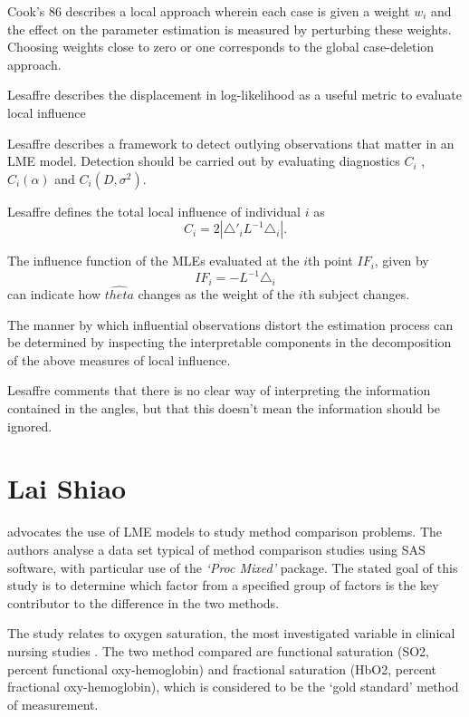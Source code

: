 \documentclass[12pt, a4paper]{report}
\theoremstyle{plain}
\theoremstyle{definition}
\theoremstyle{remark}
\begin{document}
	
	\citep{cook86}
	Cook's 86 describes a local approach wherein each case is given a
	weight $w_{i}$ and the effect on the parameter estimation is
	measured by perturbing these weights. Choosing weights close to
	zero or one corresponds to the global case-deletion approach.
	
	Lesaffre  describes the displacement in log-likelihood as a useful
	metric to evaluate local influence %
	
	Lesaffre describes a framework to detect outlying observations
	that matter in an LME model. Detection should be carried out by
	evaluating diagnostics $C_{i}$ , $C_{i}(\alpha)$ and $C_{i}(D,
	\sigma^2)$.
	
	Lesaffre defines the total local influence of individual $i$ as
	\begin{equation}
	C_{i} = 2 | \triangle \prime _{i} L^{-1} \triangle_{i}|.
	\end{equation}
	
	The influence function of the MLEs evaluated at the $i$th point
	$IF_{i}$, given by
	\begin{equation}
	IF_{i} = -L^{-1}\triangle _{i}
	\end{equation}
	can indicate how $\hat{theta}$ changes as the weight of the $i$th
	subject changes.
	
	The manner by which influential observations
	distort the estimation process can be determined by inspecting the
	interpretable components in the decomposition of the above
	measures of local influence.
	
	
	Lesaffre comments that there is no clear way of interpreting the
	information contained in the angles, but that this doesn't mean
	the information should be ignored.
	
	\section{Lai Shiao}
	
	\citet{LaiShiao} advocates the use of LME models to study method comparison problems. The authors analyse a data set typical of method comparison studies using SAS software, with particular use of the \emph{`Proc Mixed'} package. The stated goal of this study is to determine which factor from a specified group of factors is the key contributor to the difference in the two methods.
	
	The study relates to oxygen saturation, the most investigated variable in clinical nursing studies \citep{LaiShiao}. The two method compared are functional saturation (SO2, percent functional oxy-hemoglobin) and fractional saturation (HbO2, percent fractional oxy-hemoglobin), which is considered to be the `gold standard' method of measurement.
	
\end{document}
